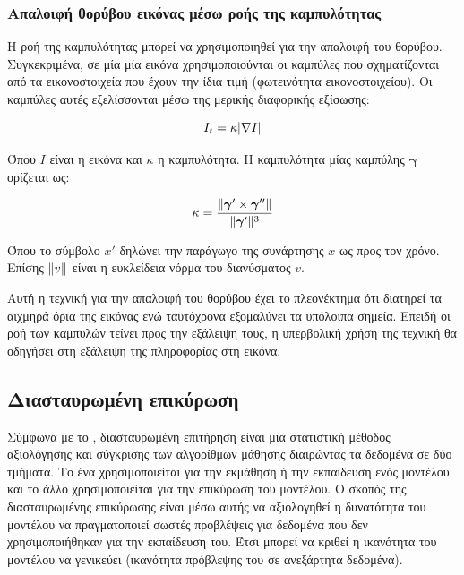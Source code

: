 \documentclass[a4paper,12pt]{article}
\DeclarePairedDelimiter\abs{\lvert}{\rvert}
\DeclarePairedDelimiter\norm{\lVert}{\rVert}
\begin{document}
\subsubsection{Απαλοιφή θορύβου εικόνας μέσω ροής της καμπυλότητας}
\label{curvature_flow:1}

Η ροή της καμπυλότητας μπορεί να χρησιμοποιηθεί για την απαλοιφή του θορύβου.
Συγκεκριμένα, σε μία μία εικόνα χρησιμοποιούνται οι καμπύλες που σχηματίζονται
από τα εικονοστοιχεία που έχουν την ίδια τιμή (φωτεινότητα εικονοστοιχείου). Οι
καμπύλες αυτές εξελίσσονται \cite{curvature_flow:1} μέσω της μερικής διαφορικής
εξίσωσης:

\begin{equation} \label{eq:curvature_flow:1}
    I_t = \kappa \abs{\nabla I}
\end{equation}

Όπου $I$ είναι η εικόνα και $\kappa$ η καμπυλότητα. Η καμπυλότητα μίας καμπύλης
$\bm{\gamma}$ ορίζεται ως:

\begin{equation*}
    \kappa = \frac {\norm{\bm{\gamma}' \times \bm{\gamma}''}}
                   {\norm{\bm{\gamma}'}^3}
\end{equation*}

Όπου το σύμβολο $x'$ δηλώνει την παράγωγο της συνάρτησης $x$ ως προς τον χρόνο.
Επίσης $\norm{v}$ είναι η ευκλείδεια νόρμα του διανύσματος $v$.

Αυτή η τεχνική για την απαλοιφή του θορύβου έχει το πλεονέκτημα ότι διατηρεί
τα αιχμηρά όρια της εικόνας ενώ ταυτόχρονα εξομαλύνει τα υπόλοιπα σημεία. Επειδή
οι ροή των καμπυλών τείνει προς την εξάλειψη τους, η υπερβολική χρήση της
τεχνική θα οδηγήσει στη εξάλειψη της πληροφορίας στη εικόνα.

\subsection{Διασταυρωμένη επικύρωση}

Σύμφωνα με το \cite{cross_validation:1}, διασταυρωμένη επιτήρηση είναι μια
στατιστική μέθοδος αξιολόγησης και σύγκρισης των αλγορίθμων μάθησης διαιρώντας
τα δεδομένα σε δύο τμήματα. Το ένα χρησιμοποιείται για την εκμάθηση ή την
εκπαίδευση ενός μοντέλου και το άλλο χρησιμοποιείται για την επικύρωση του
μοντέλου. Ο σκοπός της διασταυρωμένης επικύρωσης είναι μέσω αυτής να αξιολογηθεί
η δυνατότητα του μοντέλου να πραγματοποιεί σωστές προβλέψεις για δεδομένα που
δεν χρησιμοποιήθηκαν για την εκπαίδευση του. Έτσι μπορεί να κριθεί η ικανότητα
του μοντέλου να γενικεύει (ικανότητα πρόβλεψης του σε ανεξάρτητα δεδομένα).
\end{document}
